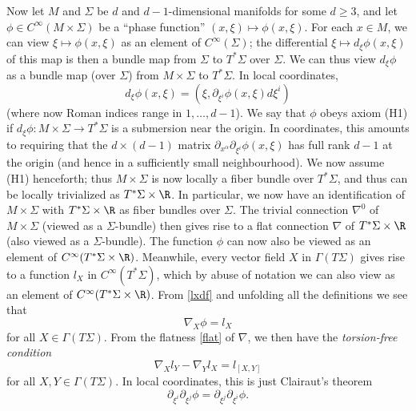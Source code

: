 \documentclass{article}
\numberwithin{equation}{section}
\theoremstyle{plain}
\begin{document}
Now let $M$ and $\Sigma$ be $d$ and $d-1$-dimensional manifolds for some $d \geq 3$, and let $\phi \in C^\infty(M \times \Sigma)$ be a ``phase function'' $(x,\xi) \mapsto \phi(x,\xi)$.  For each $x \in M$, we can view $\xi \mapsto \phi(x,\xi)$ as an element of $C^\infty(\Sigma)$; the differential $\xi \mapsto d_\xi \phi(x,\xi)$ of this map is then a bundle map from $\Sigma$ to $T^* \Sigma$ over $\Sigma$.  We can thus view $d_\xi \phi$ as a bundle map (over $\Sigma$) from $M \times \Sigma$ to $T^* \Sigma$.  In local coordinates,
$$ d_\xi \phi(x,\xi) = (\xi, \partial_{\xi^i} \phi(x,\xi) d\xi^i)$$
(where now Roman indices range in $1,\dots,d-1$).
We say that $\phi$ obeys axiom (H1) if $d_\xi \phi: M \times \Sigma \to T^* \Sigma$ is a submersion near the origin.  In coordinates, this amounts to requiring that the $d \times (d-1)$ matrix $\partial_{x^\alpha} \partial_{\xi^i} \phi(x,\xi)$ has full rank $d-1$ at the origin (and hence in a sufficiently small neighbourhood).  We now assume (H1) henceforth; thus $M \times \Sigma$ is now locally a fiber bundle over $T^* \Sigma$, and thus can be locally trivialized as $T^*\Sigma \times \R$.  In particular, we now have an identification of $M \times \Sigma$ with $T^* \Sigma \times \R$ as fiber bundles over $\Sigma$.  The trivial connection $\nabla^0$ of $M \times \Sigma$ (viewed as a $\Sigma$-bundle) then gives rise to a flat connection $\nabla$ of $T^* \Sigma \times \R$ (also viewed as a $\Sigma$-bundle).  The function $\phi$ can now also be viewed as an element of $C^\infty(T^* \Sigma \times \R)$.  Meanwhile, every vector field $X$ in $\Gamma(T\Sigma)$ gives rise to a function $l_X$ in $C^\infty(T^*\Sigma)$, which by abuse of notation we can also view as an element of $C^\infty(T^* \Sigma \times \R)$.  From \eqref{lxdf} and unfolding all the definitions we see that
\begin{equation}\label{nx}
    \nabla_X \phi = l_X
\end{equation}
for all $X \in \Gamma(T\Sigma)$.  From the flatness \eqref{flat} of $\nabla$, we then have the \emph{torsion-free condition}
\begin{equation}\label{lxy}
     \nabla_X l_Y - \nabla_Y l_X = l_{[X,Y]}
\end{equation}
for all $X,Y \in \Gamma(T\Sigma)$.  In local coordinates, this is just Clairaut's theorem
$$ \partial_{\xi^i} \partial_{\xi^j} \phi = \partial_{\xi^j} \partial_{\xi^i} \phi.$$

\smallskip
\end{document}
